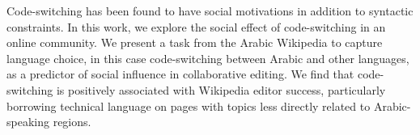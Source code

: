 Code-switching has been found to have social motivations in addition to syntactic constraints. In this work, we explore the social effect of code-switching in an online community. We present a task from the Arabic Wikipedia to capture language choice, in this case code-switching between Arabic and other languages, as a predictor of social influence in collaborative editing. We find that code-switching is positively associated with Wikipedia editor success, particularly borrowing technical language on pages with topics less directly related to Arabic-speaking regions.
